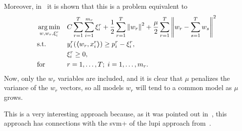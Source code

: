Moreover, in~\cite{EvgeniouP04} it is shown that this is a problem equivalent to
\begin{equation}
    \nonumber
    \begin{aligned}
         & \operatorname*{arg\min}_{w, w_r, \xi_i^r}
         &                           & C \sum_{r=1}^T \sum_{i=1}^{m_r} \xi_i^r +  \frac{1}{2} \sum_{r=1}^T \left\lVert w_r\right\rVert^2 + \frac{\mu}{2} \sum_{r=1}^T  \left\lVert w_r - \sum_{s=1}^T w_s\right\rVert^2                                                      \\
         & \text{s.t.}
         &                           & y_{i}^r ( \bm{\left\langle} w_r, x_{i}^r \bm{\right\rangle}) \geq p_i^r - \xi_i^r ,                                                                                                                                                                               \\
         &                           &                                                                                                                                                                                & \xi_i^r \geq 0,                                    \\
         & \text{for }               &                                                                                                                                                                                & r=1, \ldots, T; \; i=1, \ldots, m_r.
    \end{aligned}
\end{equation}
Now, only the $w_r$ variables are included, and it is clear that $\mu$ penalizes the variance of the $w_r$ vectors, so all models $w_r$ will tend to a common model as $\mu$ grows.

This is a very interesting approach because, as it was pointed out in~\cite{LiangC08}, this approach has connections with the \acrshort{svm}+ of the \acrshort{lupi} approach from~\cite{VapnikI15a}.


